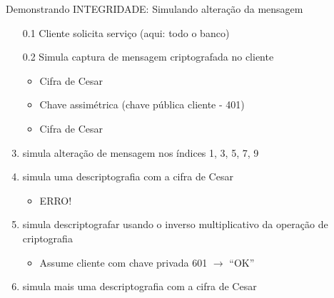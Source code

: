 \documentclass[xcolor=dvipsnames,table]{beamer}
\begin{document}
\begin{frame}{Demonstrando INTEGRIDADE: Simulando alteração da mensagem}
	\begin{enumerate}
		\item[0.1] Cliente solicita serviço (aqui: todo o banco)
		\item[0.2] Simula captura de mensagem criptografada no cliente
		\begin{itemize}
			\item Cifra de Cesar
			\item Chave assimétrica (chave pública cliente - 401)
			\item Cifra de Cesar
		\end{itemize}
		\item simula alteração de mensagem nos índices 1, 3, 5, 7, 9 \pause
		\item simula uma descriptografia com a cifra de Cesar
		\begin{itemize}
			\item ERRO!
		\end{itemize} \pause
		\item simula descriptografar usando o inverso multiplicativo da operação de criptografia
		\begin{itemize}
			\item Assume cliente com chave privada 601 $\rightarrow$ ``OK''
		\end{itemize}
		\item simula mais uma descriptografia com a cifra de Cesar
	\end{enumerate}
\end{frame}

\begin{frame}[plain]{}
    \maketitle
\end{frame}


	
\end{document}
